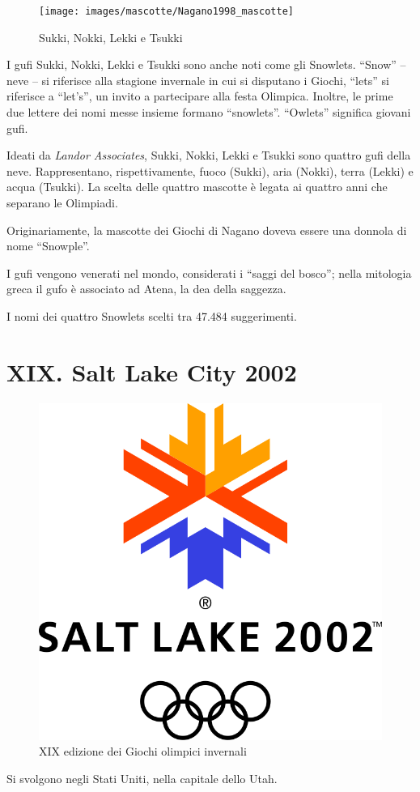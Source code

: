 \documentclass[
]{book}
\begin{document}
\begin{figure}
\texttt{[image: images/mascotte/Nagano1998\_mascotte]} \caption{Sukki, Nokki, Lekki e Tsukki}\label{fig:unnamed-chunk-66}
\end{figure}

I gufi Sukki, Nokki, Lekki e Tsukki sono anche noti come gli Snowlets. ``Snow'' -- neve -- si riferisce alla stagione invernale in cui si disputano i Giochi, ``lets'' si riferisce a ``let's'', un invito a partecipare alla festa Olimpica. Inoltre, le prime due lettere dei nomi messe insieme formano ``snowlets''. ``Owlets'' significa giovani gufi.

Ideati da \emph{Landor Associates}, Sukki, Nokki, Lekki e Tsukki sono quattro gufi della neve. Rappresentano, rispettivamente, fuoco (Sukki), aria (Nokki), terra (Lekki) e acqua (Tsukki). La scelta delle quattro mascotte è legata ai quattro anni che separano le Olimpiadi.

Originariamente, la mascotte dei Giochi di Nagano doveva essere una donnola di nome ``Snowple''.

I gufi vengono venerati nel mondo, considerati i ``saggi del bosco''; nella mitologia greca il gufo è associato ad Atena, la dea della saggezza.

I nomi dei quattro Snowlets scelti tra 47.484 suggerimenti.

\chapter*{XIX. Salt Lake City 2002}\label{xix.-salt-lake-city-2002}

\begin{figure}
\includegraphics[width=0.4\linewidth]{images/loghi/2002} \caption{XIX edizione dei Giochi olimpici invernali}\label{fig:unnamed-chunk-67}
\end{figure}

Si svolgono negli Stati Uniti, nella capitale dello Utah.
\end{document}
